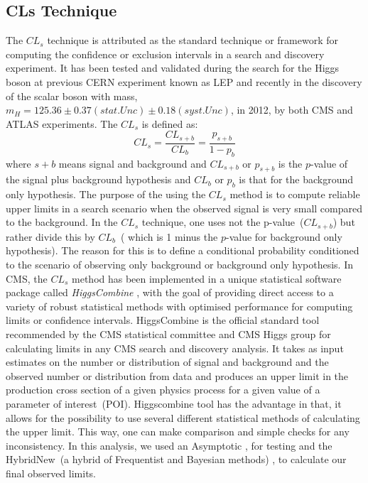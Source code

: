 \subsection{CLs Technique}
The $CL_{s}$ technique \cite{CLS} is attributed as the standard technique or framework for computing the confidence or exclusion intervals in a search and discovery experiment. It has been tested and validated during the search for the Higgs boson at previous CERN experiment known as LEP and recently in the discovery of the scalar boson with mass, $m_{H} = 125.36\pm 0.37(stat.Unc)\pm0.18(syst.Unc)$, in 2012, by both CMS and ATLAS experiments.
\newline
The $CL_{s}$ is defined as:
\begin{equation}
CL_{s}  =  \frac{CL_{s+b}}{CL_{b}}  = \frac{p_{s+b}}{1 - p_{b}}
\end{equation}
where $s+b$ means signal and background and $CL_{s+b}$ or $p_{s+b}$ is the $p$-value of the signal plus background hypothesis and $CL_{b}$ or $p_{b}$ is that for the background only hypothesis.
\newline
The purpose of the using the $CL_{s}$ method is to compute reliable upper limits in a search scenario when
the observed signal is very small compared to the background.
In the $CL_{s}$ technique, one uses not the p-value~($CL_{s+b}$) but rather divide this by $CL_{b}$~( which is 1 minus the $p$-value for background only hypothesis). The reason for this is to define a conditional probability conditioned to the scenario of observing only background or background only hypothesis.
\newline
In CMS, the $CL_{s}$ method has been implemented in a unique statistical software package called \textit{HiggsCombine} \cite{LIMITS}, with the goal of providing direct access to a variety of robust statistical methods with optimised performance for computing limits or confidence intervals.
HiggsCombine is the official standard tool recommended by the CMS statistical committee and CMS Higgs group for calculating limits in any CMS search and discovery analysis.
It takes as input estimates on the number or distribution of signal and background and the observed number or distribution from data and produces an upper limit in the production cross section of a given physics process for a given value of a parameter of interest~(POI).
Higgscombine tool has the advantage in that, it allows for the possibility to use several different statistical methods of calculating the upper limit. This way, one can make comparison and simple checks for any inconsistency. In this analysis, we used an Asymptotic \cite{ASYMP}, for testing and the HybridNew~(a hybrid of Frequentist and Bayesian methods) \cite{LIMITS}, to calculate our final observed  limits. 

